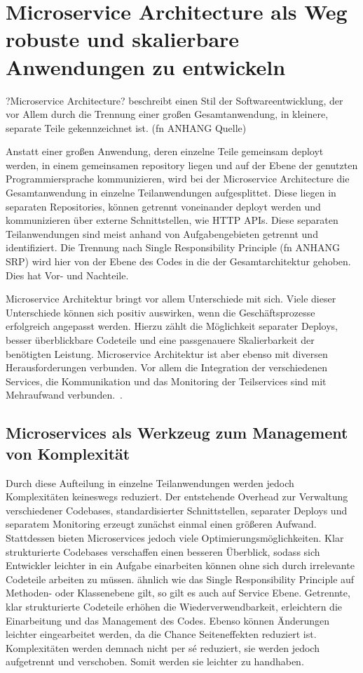\chapter{Microservice Architecture als Weg robuste und skalierbare Anwendungen zu entwickeln}
?Microservice Architecture? beschreibt einen Stil der Softwareentwicklung, der vor Allem durch die Trennung einer großen Gesamtanwendung, in kleinere, separate Teile gekennzeichnet ist. (fn ANHANG Quelle)

Anstatt einer großen Anwendung, deren einzelne Teile gemeinsam deployt werden, in einem gemeinsamen repository liegen und auf der Ebene der genutzten Programmiersprache kommunizieren, wird bei der Microservice Architecture die Gesamtanwendung in einzelne Teilanwendungen aufgesplittet. Diese liegen in separaten Repositories, können getrennt voneinander deployt werden und kommunizieren über externe Schnittstellen, wie HTTP APIs. Diese separaten Teilanwendungen sind meist anhand von Aufgabengebieten getrennt und identifiziert. Die Trennung nach Single Responsibility Principle (fn ANHANG SRP) wird hier von der Ebene des Codes in die der Gesamtarchitektur gehoben. Dies hat Vor- und Nachteile.

Microservice Architektur bringt vor allem Unterschiede mit sich. Viele dieser Unterschiede können sich positiv auswirken, wenn die Geschäftsprozesse erfolgreich angepasst werden. Hierzu zählt die Möglichkeit separater Deploys, besser überblickbare Codeteile und eine passgenauere Skalierbarkeit der benötigten Leistung. Microservice Architektur ist aber ebenso mit diversen Herausforderungen verbunden. Vor allem die Integration der verschiedenen Services, die Kommunikation und das Monitoring der Teilservices sind mit Mehraufwand verbunden.~\cite{feathers2004working}.

\section{Microservices als Werkzeug zum Management von Komplexität}
Durch diese Aufteilung in einzelne Teilanwendungen werden jedoch Komplexitäten keineswegs reduziert. Der entstehende Overhead zur Verwaltung verschiedener Codebases, standardisierter Schnittstellen, separater Deploys und separatem Monitoring erzeugt zunächst einmal einen größeren Aufwand. Stattdessen bieten Microservices jedoch viele Optimierungsmöglichkeiten. Klar strukturierte Codebases verschaffen einen besseren Überblick, sodass sich Entwickler leichter in ein Aufgabe einarbeiten können ohne sich durch irrelevante Codeteile arbeiten zu müssen. ähnlich wie das Single Responsibility Principle auf Methoden- oder Klassenebene gilt, so gilt es auch auf Service Ebene. Getrennte, klar strukturierte Codeteile erhöhen die Wiederverwendbarkeit, erleichtern die Einarbeitung und das Management des Codes. Ebenso können Änderungen leichter eingearbeitet werden, da die Chance Seiteneffekten reduziert ist. Komplexitäten werden demnach nicht per sé reduziert, sie werden jedoch aufgetrennt und verschoben. Somit werden sie leichter zu handhaben.

